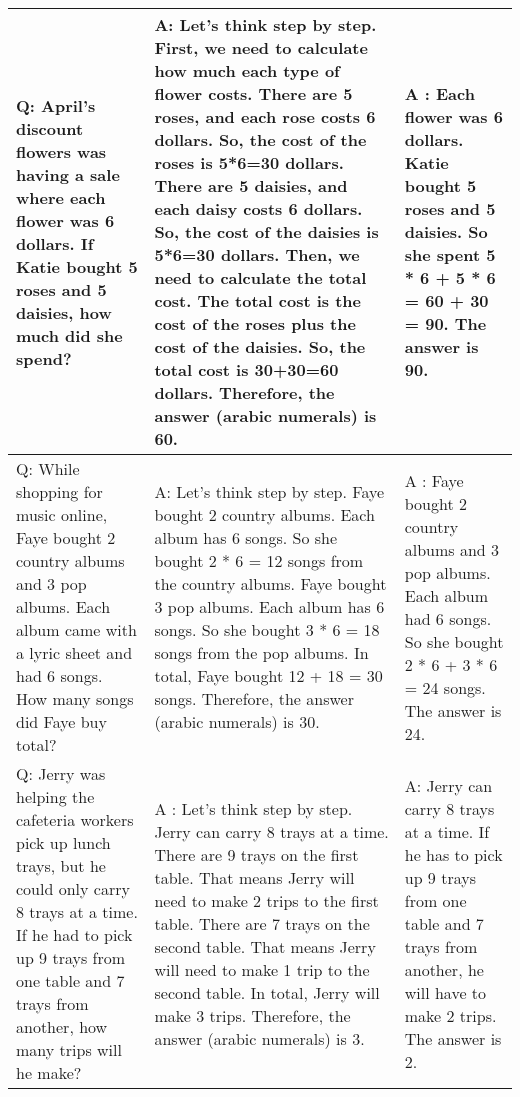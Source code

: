 \documentclass{article}
\newcommand{\okmark}{{\textbf{\textcolor[rgb]{0.1, 0.5, 0.1}{}}}}
\newcommand{\ngmark}{{\textbf{\color{red}{\ding{55}}}}}
\newcommand{\bred}[1]{{\textbf{\color{red}{#1}}}}
\begin{document}
\begin{center}
\begin{longtable}{|p{}|p{}|p{}|}
\midrule





















Q: April's discount flowers was having a sale where each flower was 6 dollars. If Katie bought 5 roses and 5 daisies, how much did she spend? 
&A: Let's think step by step. First, we need to calculate how much each type of flower costs. There are 5 roses, and each rose costs 6 dollars. So, the cost of the roses is 5*6=30 dollars. There are 5 daisies, and each daisy costs 6 dollars. So, the cost of the daisies is 5*6=30 dollars. Then, we need to calculate the total cost. The total cost is the cost of the roses plus the cost of the daisies. So, the total cost is 30+30=60 dollars. Therefore, the answer (arabic numerals) is 60. \okmark
&A \bred{(CALCULATOR ERROR)}: Each flower was 6 dollars. Katie bought 5 roses and 5 daisies. So she spent 5 * 6 + 5 * 6 = 60 + 30 = 90. The answer is 90. \ngmark \\

\midrule

Q: While shopping for music online, Faye bought 2 country albums and 3 pop albums. Each album came with a lyric sheet and had 6 songs. How many songs did Faye buy total? &A: Let's think step by step. Faye bought 2 country albums. Each album has 6 songs. So she bought 2 * 6 = 12 songs from the country albums. Faye bought 3 pop albums. Each album has 6 songs. So she bought 3 * 6 = 18 songs from the pop albums. In total, Faye bought 12 + 18 = 30 songs. Therefore, the answer (arabic numerals) is 30. \okmark
&A \bred{(CALCULATOR ERROR)}: Faye bought 2 country albums and 3 pop albums. Each album had 6 songs. So she bought 2 * 6 + 3 * 6 = 24 songs. The answer is 24. \ngmark \\

\midrule

Q: Jerry was helping the cafeteria workers pick up lunch trays, but he could only carry 8 trays at a time. If he had to pick up 9 trays from one table and 7 trays from another, how many trips will he make?
&A \bred{(COMMONSENSE MISTAKE)}: Let's think step by step. 
Jerry can carry 8 trays at a time. 
There are 9 trays on the first table. 
That means Jerry will need to make 2 trips to the first table. 
There are 7 trays on the second table. 
That means Jerry will need to make 1 trip to the second table. 
In total, Jerry will make 3 trips. 
Therefore, the answer (arabic numerals) is 3. \ngmark
&A: Jerry can carry 8 trays at a time. If he has to pick up 9 trays from one table and 7 trays from another, he will have to make 2 trips. The answer is 2. \okmark \\


\end{longtable}
\end{center}
\end{document}
